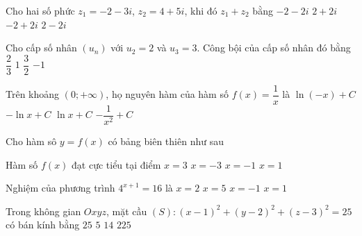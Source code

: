 \begin{ex}%
	Cho hai số phức $z_1=-2-3i$, $z_2=4+5i$, khi đó $z_1+z_2$ bằng
	\choice
	{$-2-2i$}
	{\True $2+2i$}
	{$-2+2i$}
	{$2-2i$}
\end{ex}

\begin{ex}%
	Cho cấp số nhân $\left(u_{n}\right)$ với $u_2=2$ và $u_3=3$. Công bội của cấp số nhân đó bằng
	\choice
	{$\dfrac{2}{3}$}
	{$1$}
	{\True $\dfrac{3}{2}$}
	{$-1$}
\end{ex}

\begin{ex}%
	Trên khoảng $(0;+\infty)$, họ nguyên hàm của hàm số $f(x)=\dfrac{1}{x}$ là
	\choice
	{$\ln (-x)+C$}
	{$-\ln x+C$}
	{\True $\ln x+C$}
	{$-\dfrac{1}{x^2}+C$}
\end{ex}

\begin{ex}%
	Cho hàm sô $y=f(x)$ có bảng biên thiên như sau
	\begin{center}
	\end{center}
	Hàm số $f(x)$ đạt cực tiểu tại điểm
	\choice
	{\True $x=3$}
	{$x=-3$}
	{$x=-1$}
	{$x=1$}
\end{ex}

\begin{ex}%
	Nghiệm của phương trình $4^{x+1}=16$ là
	\choice
	{$x=2$}
	{$x=5$}
	{$x=-1$}
	{\True $x=1$}
\end{ex}

\begin{ex}%
	Trong không gian $Oxyz$, mặt cầu $(S) \colon (x-1)^2+(y-2)^2+(z-3)^2=25$ có bán kính bằng
	\choice
	{$25$}
	{\True $5$}
	{$14$}
	{$225$}
\end{ex}

